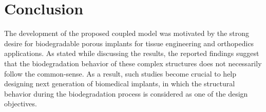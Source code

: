 \section{Conclusion}

The development of the proposed coupled model was motivated by the strong desire for biodegradable porous implants for tissue engineering and orthopedics applications. As stated while discussing the results, the reported findings suggest that the biodegradation behavior of these complex structures does not necessarily follow the common-sense. As a result, such studies become crucial to help designing next generation of biomedical implants, in which the structural behavior during the biodegradation process is considered as one of the design objectives.




\cleardoublepage

